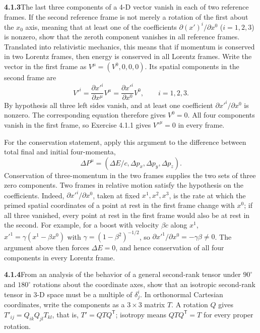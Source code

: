 \par\bigskip
\noindent\textbf{4.1.3}\quad The last three components of a 4-D vector vanish
in each of two reference frames. If the second reference frame is not merely a
rotation of the first about the $x_{0}$ axis, meaning that at least one of the
coefficients $\partial(x')^{i}/\partial x^{0}$ ($i=1,2,3$) is nonzero, show
that the zeroth component vanishes in all reference frames. Translated into
relativistic mechanics, this means that if momentum is conserved in two
Lorentz frames, then energy is conserved in all Lorentz frames.
\solution
Write the vector in the first frame as
$V^\mu=(V^0,0,0,0)$. Its spatial components in the second frame are
\[
V'^i=\frac{\partial x'^i}{\partial x^\mu}V^\mu
=\frac{\partial x'^i}{\partial x^0}V^0,
\qquad i=1,2,3.
\]
By hypothesis all three left sides vanish, and at least one coefficient
$\partial x'^i/\partial x^0$ is nonzero. The corresponding equation
therefore gives $V^0=0$. All four components vanish in the first frame,
so Exercise 4.1.1 gives $V'^\mu=0$ in every frame.

For the conservation statement, apply this argument to the difference
between total final and initial four-momenta,
\[
\Delta P^\mu=(\Delta E/c,\Delta p_x,\Delta p_y,\Delta p_z).
\]
Conservation of three-momentum in the two frames supplies the two sets of
three zero components. Two frames in relative motion satisfy the
hypothesis on the coefficients. Indeed, $\partial x'^i/\partial x^0$,
taken at fixed $x^1,x^2,x^3$, is the rate at which the primed spatial
coordinates of a point at rest in the first frame change with $x^0$; if
all three vanished, every point at rest in the first frame would also be
at rest in the second. For example, for a boost with velocity $\beta c$ along
$x^1$, $x'^1=\gamma(x^1-\beta x^0)$ with $\gamma=(1-\beta^2)^{-1/2}$, so
$\partial x'^1/\partial x^0=-\gamma\beta\ne0$. The argument above then
forces $\Delta E=0$, and hence conservation of all four components in
every Lorentz frame.

\par\bigskip
\noindent\textbf{4.1.4}\quad From an analysis of the behavior of a general
second-rank tensor under $90^{\circ}$ and $180^{\circ}$ rotations about the
coordinate axes, show that an isotropic second-rank tensor in 3-D space must
be a multiple of $\delta_{j}^{i}$.
\solution
In orthonormal Cartesian coordinates, write the components as a
$3\times3$ matrix $T$. A rotation $Q$ gives
$T'_{ij}=Q_{ik}Q_{jl}T_{kl}$, that is, $T'=QTQ^{\mathsf T}$;
isotropy means $QTQ^{\mathsf T}=T$ for every proper rotation.

